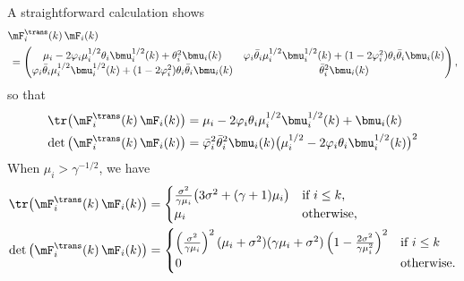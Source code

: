 A straightforward calculation shows
\[
    \begin{split}
    &\mF_i^\trans(k) \, \mF_i(k) \\
        &\,=
        \left(
        \begin{matrix}
            \mu_i 
            - 2 \varphi_i \mu_i^{1/2} \theta_i \bmu_i^{1/2}(k) 
            + \theta_i^2 \bmu_i(k) &
                \varphi_i \bar \theta_i \mu_i^{1/2} \bmu_i^{1/2}(k)
                + (1 - 2 \varphi_i^2) \theta_i \bar \theta_i \bmu_i(k) \\
            \varphi_i \bar \theta_i \mu_i^{1/2} \bmu_i^{1/2}(k)
            + (1 - 2 \varphi_i^2) \theta_i \bar \theta_i \bmu_i(k) &
                \bar \theta_i^2 \bmu_i(k)
        \end{matrix}
        \right),
    \end{split}
\]
so that
\begin{align*}
    \tr \big( \mF_i^\trans(k) \, \mF_i(k) \big)
        &= \mu_i 
           - 2 \varphi_i \theta_i \mu_i^{1/2} \bmu_i^{1/2} (k) 
           + \bmu_i(k) \\
    \det \big( \mF_i^\trans(k) \, \mF_i(k) \big)
        &= \bar \varphi_i^2 \bar \theta_i^2 \bmu_i(k)
           \big( \mu_i^{1/2} - 2 \varphi_i \theta_i \bmu_i^{1/2}(k) \big)^2
\end{align*}
When $\mu_i > \gamma^{-1/2}$, we have
\begin{align*}
    \tr \big( \mF_i^\trans(k) \, \mF_i(k) \big)
        &=
            \begin{cases}
                \frac{\sigma^2}{\gamma \mu_i}
                \big(
                    3 \sigma^2 + (\gamma+1) \mu_i
                \big)
                    &\text{if $i \leq k$,} \\
                \mu_i
                    &\text{otherwise,}
            \end{cases} \\
    \det \big( \mF_i^\trans(k) \, \mF_i(k) \big)
        &=
            \begin{cases}
                \left(
                    \frac{\sigma^2}{\gamma \mu_i}
                \right)^2
                (\mu_i + \sigma^2)
                (\gamma \mu_i + \sigma^2)
                \left(
                    1 - \frac{ 2 \sigma^2 }{ \gamma \mu_i^2}
                \right)^2
                    &\text{if $i \leq k$} \\
                0
                    &\text{otherwise.}
            \end{cases}
\end{align*}
